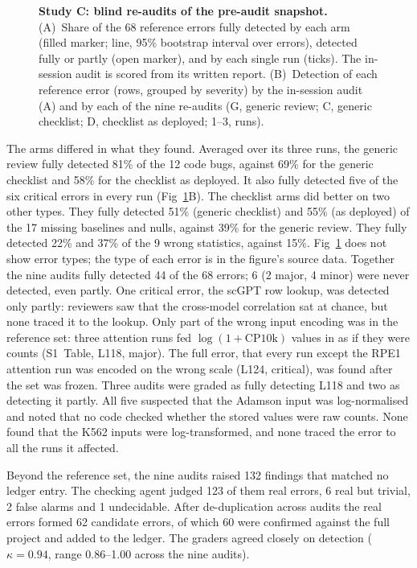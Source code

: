 \begin{figure}[H]
\caption{\textbf{Study C: blind re-audits of the pre-audit snapshot.}
(A)~Share of the 68 reference errors fully detected by each arm (filled
marker; line, 95\% bootstrap interval over errors), detected fully or
partly (open marker), and by each single run (ticks). The in-session
audit is scored from its written report. (B)~Detection of each reference
error (rows, grouped by severity) by the in-session audit (A) and by each
of the nine re-audits (G, generic review; C, generic checklist; D,
checklist as deployed; 1--3, runs).}
\label{fig:studyC}
\end{figure}

The arms differed in what they found. Averaged over its three runs, the
generic review fully detected 81\% of the 12 code bugs, against 69\% for
the generic checklist and 58\% for the checklist as deployed. It also
fully detected five of the six critical errors in every run
(Fig~\ref{fig:studyC}B). The checklist arms did better on two other
types. They fully detected 51\% (generic checklist) and 55\% (as
deployed) of the 17 missing baselines and nulls, against 39\% for the
generic review. They fully detected 22\% and 37\% of the 9 wrong
statistics, against 15\%. Fig~\ref{fig:studyC} does not show error
types; the type of each error is in the figure's source data. Together
the nine audits fully
detected 44 of the 68 errors; 6 (2 major, 4 minor) were never detected,
even partly. One critical error, the scGPT row lookup, was detected only
partly: reviewers saw that the cross-model correlation sat at chance, but
none traced it to the lookup. Only part of the wrong input encoding was
in the reference set: three attention runs fed $\log(1+\text{CP10k})$
values in as if they were counts (S1~Table, L118, major). The full error,
that every run except the RPE1 attention run was encoded on the wrong
scale (L124, critical), was found after the set was frozen. Three audits
were graded as fully detecting L118 and two as detecting it partly. All
five suspected that the Adamson input was log-normalised and noted that
no code checked whether the stored values were raw counts. None found
that the K562 inputs were log-transformed, and none traced the error to
all the runs it affected.

Beyond the reference set, the nine audits raised 132 findings that
matched no ledger entry. The checking agent judged 123 of them real
errors, 6 real but trivial, 2 false alarms and 1 undecidable. After
de-duplication across audits the real errors formed 62 candidate errors,
of which 60 were confirmed against the full project and added to the
ledger. The graders
agreed closely on detection ($\kappa = 0.94$, range 0.86--1.00 across the
nine audits).

